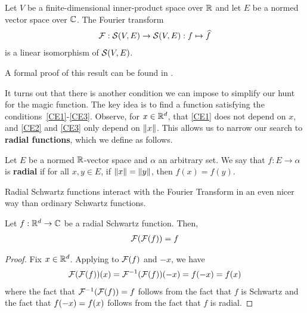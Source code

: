 \begin{boxtheorem}\label{Ch3:Thm:FourierSchwartz_CLE}
    Let $V$ be a finite-dimensional inner-product space over $\mathbb{R}$ and let $E$ be a normed vector space over $\mathbb{C}$. The Fourier transform
    \begin{align*}
        \mathcal{F} : \mathcal{S}(V, E) \to \mathcal{S}(V, E) : f \mapsto \widehat{f}
    \end{align*}
    is a linear isomorphism of $\mathcal{S}(V, E)$. %
\end{boxtheorem}

A formal proof of this result can be found in \mathlib.

It turns out that there is another condition we can impose to simplify our hunt for the magic function. The key idea is to find a function satisfying the conditions~\ref{CE1}-\ref{CE3}. Observe, for $x \in \mathbb{R}^d$, that \ref{CE1} does not depend on $x$, and \ref{CE2} and \ref{CE3} only depend on $\left\lVert x \right\rVert$. This allows us to narrow our search to \textbf{radial functions}, which we define as follows.

\begin{boxdefinition}
    Let $E$ be a normed $\mathbb{R}$-vector space and $\alpha$ an arbitrary set. We say that $f : E \to \alpha$ is \textbf{radial} if for all $x, y \in E$, if $\left\lVert x \right\rVert = \left\lVert y \right\rVert$, then $f(x) = f(y)$.
\end{boxdefinition}

Radial Schwartz functions interact with the Fourier Transform in an even nicer way than ordinary Schwartz functions.

\begin{boxproposition}\label{Ch3:Prop:RadialSchwartzFourier}
    Let $f : \mathbb{R}^d \to \mathbb{C}$ be a radial Schwartz function. Then,
    \begin{align*}
        \mathcal{F}\!\left( \mathcal{F}\!\left( f \right) \right) = f
    \end{align*}
\end{boxproposition}
\begin{proof}
    Fix $x \in \mathbb{R}^d$. Applying  to $\mathcal{F}\!\left( f \right)$ and $-x$, we have
    \begin{align*}
        \F\of{\F\of{f}}\of{x} = \F\inv\of{\F\of{f}}\of{-x} = f\of{-x} = f\of{x}
    \end{align*}
    where the fact that $\mathcal{F}^{-1}\!\left( \mathcal{F}\!\left( f \right) \right) = f$ follows from the fact that $f$ is Schwartz and the fact that $f\!\left( -x \right) = f\!\left( x \right)$ follows from the fact that $f$ is radial.
\end{proof}

